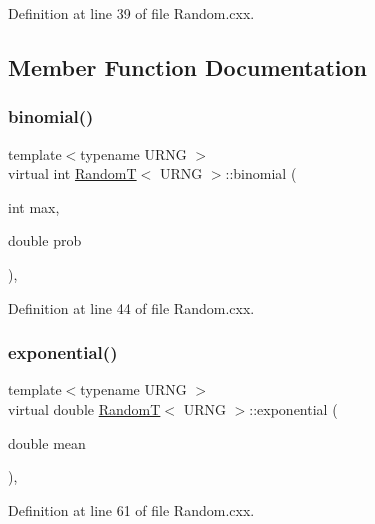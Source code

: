 Definition at line 39 of file Random.\+cxx.



\subsection{Member Function Documentation}
\mbox{\label{class_random_t_ac156dfd6f81d0e72256bcd5c1e272a47}} 
\subsubsection{\texorpdfstring{binomial()}{binomial()}}
{\footnotesize\ttfamily template$<$typename U\+R\+NG $>$ \\
virtual int \hyperlink{class_random_t}{RandomT}$<$ U\+R\+NG $>$\+::binomial (\begin{DoxyParamCaption}\item[{int}]{max,  }\item[{double}]{prob }\end{DoxyParamCaption})\hspace{0.3cm}{\ttfamily [inline]}, {\ttfamily [virtual]}}



Definition at line 44 of file Random.\+cxx.

\mbox{\label{class_random_t_ab289d92c8d8c36fd6951b85579373d75}} 
\subsubsection{\texorpdfstring{exponential()}{exponential()}}
{\footnotesize\ttfamily template$<$typename U\+R\+NG $>$ \\
virtual double \hyperlink{class_random_t}{RandomT}$<$ U\+R\+NG $>$\+::exponential (\begin{DoxyParamCaption}\item[{double}]{mean }\end{DoxyParamCaption})\hspace{0.3cm}{\ttfamily [inline]}, {\ttfamily [virtual]}}



Definition at line 61 of file Random.\+cxx.

\mbox{\label{class_random_t_a1dd7e5415d2ab8c7b4544cc770ec38d9}} 
